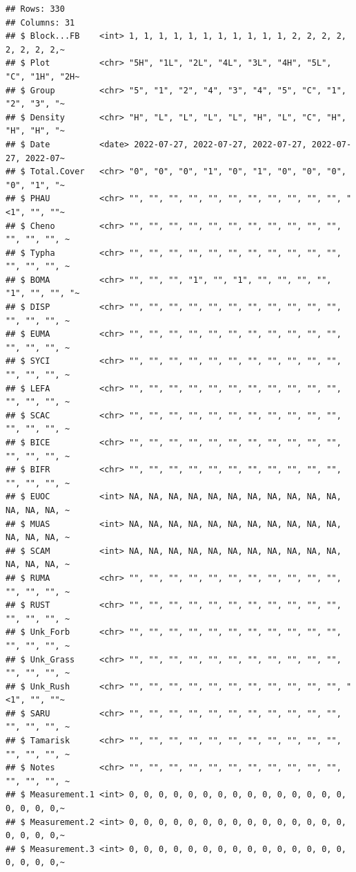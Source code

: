 \documentclass[
]{book}
\begin{document}
\begin{verbatim}
## Rows: 330
## Columns: 31
## $ Block...FB    <int> 1, 1, 1, 1, 1, 1, 1, 1, 1, 1, 1, 2, 2, 2, 2, 2, 2, 2, 2,~
## $ Plot          <chr> "5H", "1L", "2L", "4L", "3L", "4H", "5L", "C", "1H", "2H~
## $ Group         <chr> "5", "1", "2", "4", "3", "4", "5", "C", "1", "2", "3", "~
## $ Density       <chr> "H", "L", "L", "L", "L", "H", "L", "C", "H", "H", "H", "~
## $ Date          <date> 2022-07-27, 2022-07-27, 2022-07-27, 2022-07-27, 2022-07~
## $ Total.Cover   <chr> "0", "0", "0", "1", "0", "1", "0", "0", "0", "0", "1", "~
## $ PHAU          <chr> "", "", "", "", "", "", "", "", "", "", "", "<1", "", ""~
## $ Cheno         <chr> "", "", "", "", "", "", "", "", "", "", "", "", "", "", ~
## $ Typha         <chr> "", "", "", "", "", "", "", "", "", "", "", "", "", "", ~
## $ BOMA          <chr> "", "", "", "1", "", "1", "", "", "", "", "1", "", "", "~
## $ DISP          <chr> "", "", "", "", "", "", "", "", "", "", "", "", "", "", ~
## $ EUMA          <chr> "", "", "", "", "", "", "", "", "", "", "", "", "", "", ~
## $ SYCI          <chr> "", "", "", "", "", "", "", "", "", "", "", "", "", "", ~
## $ LEFA          <chr> "", "", "", "", "", "", "", "", "", "", "", "", "", "", ~
## $ SCAC          <chr> "", "", "", "", "", "", "", "", "", "", "", "", "", "", ~
## $ BICE          <chr> "", "", "", "", "", "", "", "", "", "", "", "", "", "", ~
## $ BIFR          <chr> "", "", "", "", "", "", "", "", "", "", "", "", "", "", ~
## $ EUOC          <int> NA, NA, NA, NA, NA, NA, NA, NA, NA, NA, NA, NA, NA, NA, ~
## $ MUAS          <int> NA, NA, NA, NA, NA, NA, NA, NA, NA, NA, NA, NA, NA, NA, ~
## $ SCAM          <int> NA, NA, NA, NA, NA, NA, NA, NA, NA, NA, NA, NA, NA, NA, ~
## $ RUMA          <chr> "", "", "", "", "", "", "", "", "", "", "", "", "", "", ~
## $ RUST          <chr> "", "", "", "", "", "", "", "", "", "", "", "", "", "", ~
## $ Unk_Forb      <chr> "", "", "", "", "", "", "", "", "", "", "", "", "", "", ~
## $ Unk_Grass     <chr> "", "", "", "", "", "", "", "", "", "", "", "", "", "", ~
## $ Unk_Rush      <chr> "", "", "", "", "", "", "", "", "", "", "", "<1", "", ""~
## $ SARU          <chr> "", "", "", "", "", "", "", "", "", "", "", "", "", "", ~
## $ Tamarisk      <chr> "", "", "", "", "", "", "", "", "", "", "", "", "", "", ~
## $ Notes         <chr> "", "", "", "", "", "", "", "", "", "", "", "", "", "", ~
## $ Measurement.1 <int> 0, 0, 0, 0, 0, 0, 0, 0, 0, 0, 0, 0, 0, 0, 0, 0, 0, 0, 0,~
## $ Measurement.2 <int> 0, 0, 0, 0, 0, 0, 0, 0, 0, 0, 0, 0, 0, 0, 0, 0, 0, 0, 0,~
## $ Measurement.3 <int> 0, 0, 0, 0, 0, 0, 0, 0, 0, 0, 0, 0, 0, 0, 0, 0, 0, 0, 0,~
\end{verbatim}
\end{document}
